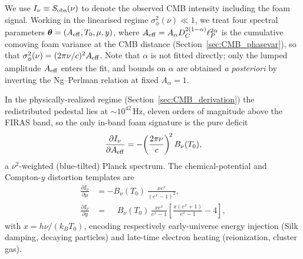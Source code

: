 \documentclass[aps,prd,onecolumn,amsmath,amssymb]{revtex4-2}
\begin{document}
We use $I_\nu\equiv S_{\rm obs}(\nu)$ to denote the observed CMB
intensity including the foam signal.
Working in the linearised regime
$\sigma_\phi^2(\nu)\ll 1$, we treat four spectral parameters
$\boldsymbol{\theta}=(A_{\rm eff},T_0,\mu,y)$, where
$A_{\rm eff}=A_\alpha D_C^{2(1-\alpha)}\ell_P^{2\alpha}$
is the cumulative comoving foam variance at the CMB distance
(Section~\ref{sec:CMB_phasevar}), so that
$\sigma_\phi^2(\nu)=(2\pi\nu/c)^2 A_{\rm eff}$.  Note that $\alpha$ is
not fitted directly; only the lumped amplitude $A_{\rm eff}$ enters
the fit, and bounds on $\alpha$ are obtained
\emph{a posteriori} by inverting the Ng--Perlman relation at fixed
$A_\alpha=1$.

In the physically-realized regime (Section~\ref{sec:CMB_derivation})
the redistributed pedestal lies at $\sim 10^{42}$\,Hz, eleven orders of
magnitude above the FIRAS band, so the only in-band foam signature is
the pure deficit
\begin{equation}
  \frac{\partial I_\nu}{\partial A_{\rm eff}}
    = -\!\left(\frac{2\pi\nu}{c}\right)^{\!2} B_\nu(T_0),
  \label{eq:dIdA_phys}
\end{equation}
a $\nu^2$-weighted (blue-tilted) Planck spectrum.  The
chemical-potential and Compton-$y$ distortion templates are
\begin{align}
  \frac{\partial I_\nu}{\partial\mu}
    &= -B_\nu(T_0)\,\frac{x e^x}{(e^x-1)^2}, \label{eq:dIdmu}\\
  \frac{\partial I_\nu}{\partial y}
    &= \phantom{-}B_\nu(T_0)\,\frac{x e^x}{e^x-1}
       \!\left[\frac{x(e^x+1)}{e^x-1}-4\right], \label{eq:dIdy}
\end{align}
with $x=h\nu/(k_B T_0)$, encoding respectively early-universe energy
injection (Silk damping, decaying particles) and late-time electron
heating (reionization, cluster gas).
\end{document}
